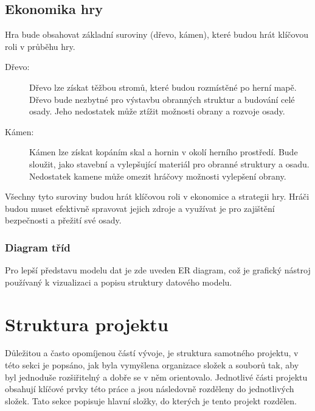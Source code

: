 \subsection{Ekonomika hry}
Hra bude obsahovat základní suroviny (dřevo, kámen), které budou hrát klíčovou roli v průběhu hry.

\begin{description}
	\item[Dřevo:] Dřevo lze získat těžbou stromů, které budou rozmístěné po herní mapě. Dřevo bude nezbytné pro výstavbu obranných struktur a budování celé osady. Jeho nedostatek může ztížit možnosti obrany a rozvoje osady.
	\item[Kámen:] Kámen lze získat kopáním skal a hornin v okolí herního prostředí. Bude sloužit, jako stavební a vylepšující materiál pro obranné struktury a osadu. Nedostatek kamene může omezit hráčovy možnosti vylepšení obrany.
\end{description}

Všechny tyto suroviny budou hrát klíčovou roli v ekonomice a strategii hry. Hráči budou muset efektivně spravovat jejich zdroje a využívat je pro zajištění bezpečnosti a přežití své osady.

\subsubsection{Diagram tříd}
Pro lepší představu modelu dat je zde uveden ER diagram, což je grafický nástroj používaný k vizualizaci a popisu struktury datového modelu.

\newpage
\section{Struktura projektu}
Důležitou a často opomíjenou částí vývoje, je struktura samotného projektu, v této sekci je popsáno, jak byla vymyšlena organizace složek a souborů tak, aby byl jednoduše rozšiřitelný a dobře se v něm orientovalo. Jednotlivé části projektu obsahují klíčové prvky této práce a jsou následovně rozděleny do jednotlivých složek. Tato sekce popisuje hlavní složky, do kterých je tento projekt rozdělen.


